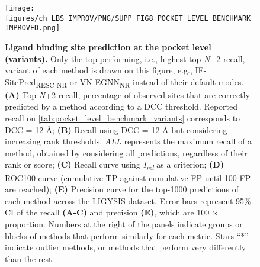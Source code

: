 \begin{figure}[ht!]
    \centering
    \texttt{[image: figures/ch\_LBS\_IMPROV/PNG/SUPP\_FIG8\_POCKET\_LEVEL\_BENCHMARK\_IMPROVED.png]}
    \caption[Ligand binding site prediction at the pocket level (variants)]{\textbf{Ligand binding site prediction at the pocket level (variants).} Only the top-performing, i.e., highest top-\textit{N}+2 recall, variant of each method is drawn on this figure, e.g., IF-SitePred\textsubscript{RESC-NR} or VN-EGNN\textsubscript{NR} instead of their default modes. \textbf{(A)} Top-\textit{N}+2 recall, percentage of observed sites that are correctly predicted by a method according to a DCC threshold. Reported recall on \autoref{tab:pocket_level_benchmark_variants} corresponds to DCC = 12 \AA{}; \textbf{(B)} Recall using DCC = 12 \AA{} but considering increasing rank thresholds. \textit{ALL} represents the maximum recall of a method, obtained by considering all predictions, regardless of their rank or score; \textbf{(C)} Recall curve using \textit{I\textsubscript{rel}} as a criterion; \textbf{(D)} ROC100 curve (cumulative TP against cumulative FP until 100 FP are reached); \textbf{(E)} Precision curve for the top-1000 predictions of each method across the LIGYSIS dataset. Error bars represent 95\% CI of the recall \textbf{(A-C)} and precision \textbf{(E)}, which are 100 $\times$ proportion. Numbers at the right of the panels indicate groups or blocks of methods that perform similarly for each metric. Stars ``*'' indicate outlier methods, or methods that perform very differently than the rest.}
    \label{fig:pocket_level_benchmark_variants}
\end{figure}


